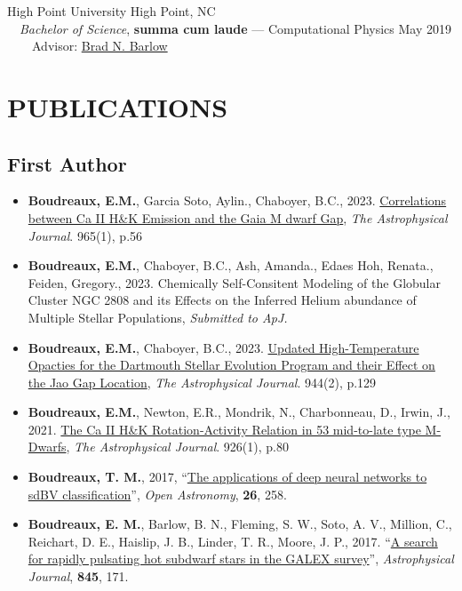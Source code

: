\documentclass[margin, 10pt]{res} %
\begin{document}
\begin{resume}
{\large High Point University} \hfill High Point, NC\\
	{\-\ \-\ \small \textit{Bachelor of Science}, \textbf{summa cum laude} --- Computational Physics} \hfill May 2019\\
{\-\ \-\ \-\ \-\ \small Advisor: \href{http://linus.highpoint.edu/~bbarlow/}{Brad N. Barlow}} \\

\section{PUBLICATIONS}
\subsection{First Author}
\begin{itemize}
  \item \textbf{Boudreaux, E.M.}, Garcia Soto, Aylin., Chaboyer, B.C., 2023. \href{https://ui.adsabs.harvard.edu/abs/2024arXiv240214984B/abstract}{Correlations between Ca II H\&K Emission and the Gaia M dwarf Gap}, \textit{The Astrophysical Journal}. 965(1), p.56
  \item \textbf{Boudreaux, E.M.}, Chaboyer, B.C., Ash, Amanda., Edaes Hoh, Renata., Feiden, Gregory., 2023. Chemically Self-Consitent Modeling of the Globular Cluster NGC 2808 and its Effects on the Inferred Helium abundance of Multiple Stellar Populations, \textit{Submitted to ApJ.}
	\item \textbf{Boudreaux, E.M.}, Chaboyer, B.C., 2023. \href{https://ui.adsabs.harvard.edu/abs/2023arXiv230110798B/abstract}{Updated High-Temperature Opacties for the Dartmouth Stellar Evolution Program and their Effect on the Jao Gap Location}, \textit{The Astrophysical Journal}. 944(2), p.129
	\item \textbf{Boudreaux, E.M.}, Newton, E.R., Mondrik, N., Charbonneau, D., Irwin, J., 2021. \href{https://ui.adsabs.harvard.edu/abs/2022ApJ...929...80B/abstract}{The Ca II H\&K Rotation-Activity Relation in 53 mid-to-late type M-Dwarfs}, \textit{The Astrophysical Journal}. 926(1), p.80
\item \textbf{Boudreaux, T. M.}, 2017, ``\href{https://ui.adsabs.harvard.edu/#abs/2017OAst...26..258B/abstract}{The applications of deep neural networks to sdBV classification}'', \textit{Open Astronomy}, \textbf{26}, 258.
\item \textbf{Boudreaux, E. M.}, Barlow, B. N., Fleming, S. W., Soto, A. V., Million, C., Reichart, D. E., Haislip, J. B., Linder, T. R., Moore, J. P., 2017. ``\href{https://ui.adsabs.harvard.edu/#abs/2017ApJ...845..171B/abstract}{A search for rapidly pulsating hot subdwarf stars in the GALEX survey}'', \textit{Astrophysical Journal}, \textbf{845}, 171.
\end{itemize}

\end{resume}
\end{document}
